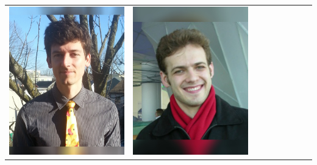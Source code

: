 \documentclass[landscape,a0paper,fontscale=0.292]{baposter}
\begin{document}
\begin{poster}
{\begin{center}
\begin{tabularx}{\linewidth}{X X X X X X X X X}
{\centering \includegraphics[width=0.65\linewidth]{hoehener.jpg}}&
{\centering \includegraphics[width=0.65\linewidth]{yershov.jpg}}&

\end{tabularx}
\end{center}}
\end{poster}
\end{document}
